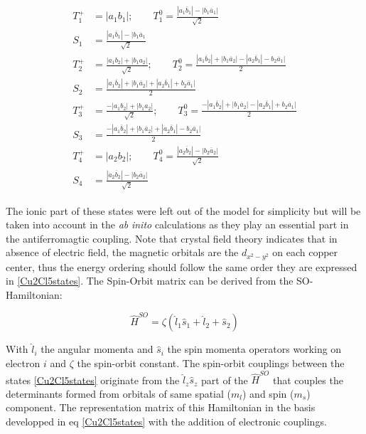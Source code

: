 \documentclass[10pt]{report}
\numberwithin{equation}{section}
\begin{document}
\begin{align}\label{Cu2Cl5states}
    \begin{split}
    T_1^+&=|a_1b_1| ; \qquad T_1^0= \frac{|a_1 \overline{b}_1|-|b_1\overline{a}_1|}{\sqrt{2}}\\
    S_1&=\frac{|a_1 \overline{b}_1|-|b_1\overline{a}_1}{\sqrt{2}}\\
    T_2^+&=\frac{|a_1b_2|+|b_1a_2|}{\sqrt{2}} ;\qquad T_2^0=\frac{|a_1\overline{b}_2|+|b_1\overline{a}_2|-|a_2\overline{b}_1|-b_2\overline{a}_1|}{2}\\
    S_2&=\frac{|a_1\overline{b}_2|+|b_1\overline{a}_2|+|a_2\overline{b}_1|+b_2\overline{a}_1|}{2}\\
    T_3^+&=\frac{-|a_1b_2|+|b_1a_2|}{\sqrt{2}} ;\qquad T_3^0=\frac{-|a_1\overline{b}_2|+|b_1\overline{a}_2|-|a_2\overline{b}_1|+b_2\overline{a}_1|}{2}\\
    S_3&=\frac{-|a_1\overline{b}_2|+|b_1\overline{a}_2|+|a_2\overline{b}_1|-b_2\overline{a}_1|}{2}\\
    T_4^+&=|a_2b_2| ; \qquad T_4^0= \frac{|a_2 \overline{b}_2|-|b_2\overline{a}_2|}{\sqrt{2}}\\
    S_4&=\frac{|a_2 \overline{b}_2|-|b_2\overline{a}_2|}{\sqrt{2}} 
    \end{split}
\end{align}

The ionic part of these states were left out of the model for simplicity but will be taken into account in the \textit{ab} \textit{inito} calculations as they play an essential part in the antiferromagtic coupling.
Note that crystal field theory indicates that in absence of electric field, the magnetic orbitals are the $d_{x^2-y^2}$ on each copper center, thus the energy ordering should follow the same order they are expressed in \ref{Cu2Cl5states}.
The Spin-Orbit matrix can be derived from the SO-Hamiltonian:

\begin{equation}
    \hat{H}^{SO}=\zeta (\hat{l}_1 \hat{s}_1 +\hat{l}_2 + \hat{s}_2)
\end{equation}

With $\hat{l}_i$ the angular momenta and $\hat{s}_i$ the spin momenta operators working on electron $i$ and $\zeta$ the spin-orbit constant.
The spin-orbit couplings between the states \ref{Cu2Cl5states} originate from the $\hat{l}_z\hat{s}_z$ part of the $\hat{H}^{SO}$ that couples the determinants formed from orbitals of same spatial ($m_l$) and spin ($m_s$) component.
The representation matrix of this Hamiltonian in the basis developped in eq \ref{Cu2Cl5states} with the addition of electronic couplings.
\end{document}
